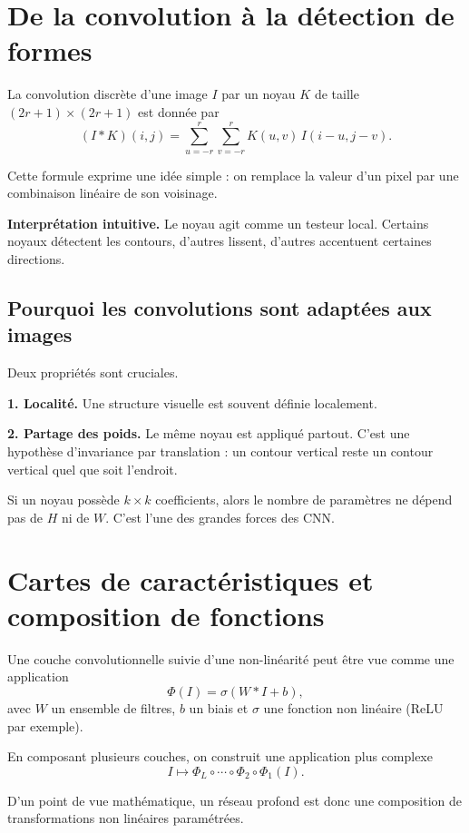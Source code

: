 \documentclass[11pt]{article}
\begin{document}
\section{De la convolution à la détection de formes}
La convolution discrète d'une image $I$ par un noyau $K$ de taille $(2r+1)\times(2r+1)$ est donnée par
\[
(I * K)(i,j)=\sum_{u=-r}^{r}\sum_{v=-r}^{r} K(u,v)\, I(i-u,j-v).
\]

Cette formule exprime une idée simple : on remplace la valeur d'un pixel par une combinaison linéaire de son voisinage.

\begin{ideaBox}
\textbf{Interprétation intuitive.} Le noyau agit comme un testeur local. Certains noyaux détectent les contours, d'autres lissent, d'autres accentuent certaines directions.
\end{ideaBox}

\subsection{Pourquoi les convolutions sont adaptées aux images}
Deux propriétés sont cruciales.

\textbf{1. Localité.} Une structure visuelle est souvent définie localement.

\textbf{2. Partage des poids.} Le même noyau est appliqué partout. C'est une hypothèse d'invariance par translation : un contour vertical reste un contour vertical quel que soit l'endroit.

\begin{mathBox}
Si un noyau possède $k\times k$ coefficients, alors le nombre de paramètres ne dépend pas de $H$ ni de $W$. C'est l'une des grandes forces des CNN.
\end{mathBox}

\section{Cartes de caractéristiques et composition de fonctions}
Une couche convolutionnelle suivie d'une non-linéarité peut être vue comme une application
\[
\Phi(I)=\sigma(W*I+b),
\]
avec $W$ un ensemble de filtres, $b$ un biais et $\sigma$ une fonction non linéaire (ReLU par exemple).

En composant plusieurs couches, on construit une application plus complexe
\[
I \mapsto \Phi_L\circ \cdots \circ \Phi_2 \circ \Phi_1(I).
\]

D'un point de vue mathématique, un réseau profond est donc une composition de transformations non linéaires paramétrées.
\end{document}
